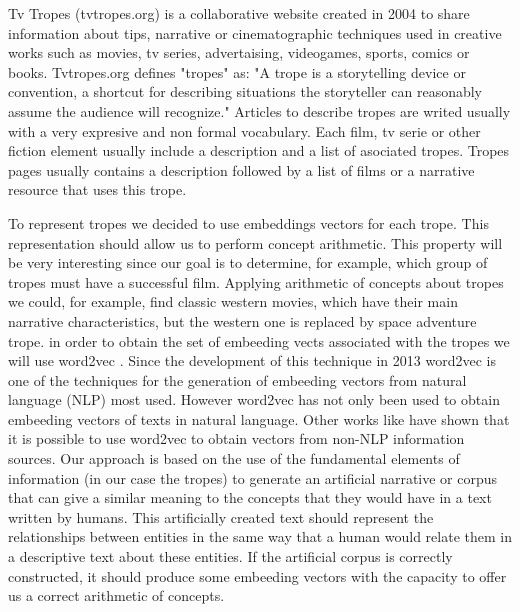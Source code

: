 \documentclass[letterpaper]{article}
\begin{document}
Tv Tropes (tvtropes.org) is a collaborative website created in 2004 to share information about tips, narrative or cinematographic techniques used in creative works such as movies, tv series, advertaising, videogames, sports, comics or books. Tvtropes.org defines "tropes" as: "A trope is a storytelling device or convention, a shortcut for describing situations the storyteller can reasonably assume the audience will recognize." Articles to describe tropes are writed usually with a very expresive and non formal vocabulary. Each film, tv serie or other fiction element usually include a description and a list of asociated tropes. Tropes pages usually contains a description followed by a list of films or a narrative resource that uses this trope.

To represent tropes we decided to use embeddings vectors for each
trope. This representation should allow us to perform concept
arithmetic. This property will be very interesting since our goal is
to determine, for example, which group of tropes must have a
successful film. Applying arithmetic of concepts about tropes we
could, for example, find classic western movies, which have their main
narrative characteristics, but the western one is replaced by space
adventure trope. in order to obtain the set of embeeding vects
associated with the tropes we will use word2vec
\cite{mikolov2013}. Since the development of this technique in 2013
word2vec is one of the techniques for the generation of embeeding
vectors from natural language (NLP) most used. However word2vec has
not only been used to obtain embeeding vectors of texts in natural
language. Other works like \cite{kazama2018} have shown that it is
possible to use word2vec to obtain vectors from non-NLP information
sources. Our approach is based on the use of the fundamental elements
of information (in our case the tropes) to generate an artificial
narrative or corpus that can give a similar meaning to the concepts
that they would have in a text written by humans. This artificially
created text should represent the relationships between entities in
the same way that a human would relate them in a descriptive text
about these entities. If the artificial corpus is correctly
constructed, it should produce some embeeding vectors with the
capacity to offer us a correct arithmetic of concepts.
\end{document}
